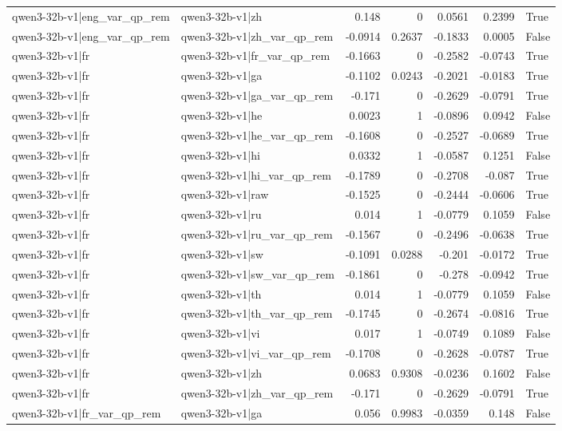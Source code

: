 \begin{table}
\begin{tabular}{l l r r r r l}
qwen3-32b-v1|eng_var_qp_rem & qwen3-32b-v1|zh & 0.148 & 0 & 0.0561 & 0.2399 & True \\
qwen3-32b-v1|eng_var_qp_rem & qwen3-32b-v1|zh_var_qp_rem & -0.0914 & 0.2637 & -0.1833 & 0.0005 & False \\
qwen3-32b-v1|fr & qwen3-32b-v1|fr_var_qp_rem & -0.1663 & 0 & -0.2582 & -0.0743 & True \\
qwen3-32b-v1|fr & qwen3-32b-v1|ga & -0.1102 & 0.0243 & -0.2021 & -0.0183 & True \\
qwen3-32b-v1|fr & qwen3-32b-v1|ga_var_qp_rem & -0.171 & 0 & -0.2629 & -0.0791 & True \\
qwen3-32b-v1|fr & qwen3-32b-v1|he & 0.0023 & 1 & -0.0896 & 0.0942 & False \\
qwen3-32b-v1|fr & qwen3-32b-v1|he_var_qp_rem & -0.1608 & 0 & -0.2527 & -0.0689 & True \\
qwen3-32b-v1|fr & qwen3-32b-v1|hi & 0.0332 & 1 & -0.0587 & 0.1251 & False \\
qwen3-32b-v1|fr & qwen3-32b-v1|hi_var_qp_rem & -0.1789 & 0 & -0.2708 & -0.087 & True \\
qwen3-32b-v1|fr & qwen3-32b-v1|raw & -0.1525 & 0 & -0.2444 & -0.0606 & True \\
qwen3-32b-v1|fr & qwen3-32b-v1|ru & 0.014 & 1 & -0.0779 & 0.1059 & False \\
qwen3-32b-v1|fr & qwen3-32b-v1|ru_var_qp_rem & -0.1567 & 0 & -0.2496 & -0.0638 & True \\
qwen3-32b-v1|fr & qwen3-32b-v1|sw & -0.1091 & 0.0288 & -0.201 & -0.0172 & True \\
qwen3-32b-v1|fr & qwen3-32b-v1|sw_var_qp_rem & -0.1861 & 0 & -0.278 & -0.0942 & True \\
qwen3-32b-v1|fr & qwen3-32b-v1|th & 0.014 & 1 & -0.0779 & 0.1059 & False \\
qwen3-32b-v1|fr & qwen3-32b-v1|th_var_qp_rem & -0.1745 & 0 & -0.2674 & -0.0816 & True \\
qwen3-32b-v1|fr & qwen3-32b-v1|vi & 0.017 & 1 & -0.0749 & 0.1089 & False \\
qwen3-32b-v1|fr & qwen3-32b-v1|vi_var_qp_rem & -0.1708 & 0 & -0.2628 & -0.0787 & True \\
qwen3-32b-v1|fr & qwen3-32b-v1|zh & 0.0683 & 0.9308 & -0.0236 & 0.1602 & False \\
qwen3-32b-v1|fr & qwen3-32b-v1|zh_var_qp_rem & -0.171 & 0 & -0.2629 & -0.0791 & True \\
qwen3-32b-v1|fr_var_qp_rem & qwen3-32b-v1|ga & 0.056 & 0.9983 & -0.0359 & 0.148 & False \\

\end{tabular}
\end{table}

